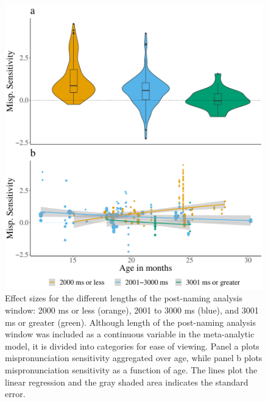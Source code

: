 \documentclass[man, noextraspace]{apa6}
\begin{document}
\begin{figure}
\centering
\includegraphics{VonHolzenBergmann_MPMetaAnalysis_files/figure-latex/PlotPostNameCondAge-1.pdf}
\caption{\label{fig:PlotPostNameCondAge}Effect sizes for the different lengths of the post-naming analysis window: 2000 ms or less (orange), 2001 to 3000 ms (blue), and 3001 ms or greater (green). Although length of the post-naming analysis window was included as a continuous variable in the meta-analytic model, it is divided into categories for ease of viewing. Panel a plots mispronunciation sensitivity aggregated over age, while panel b plots mispronunciation sensitivity as a function of age. The lines plot the linear regression and the gray shaded area indicates the standard error.}
\end{figure}
\end{document}
